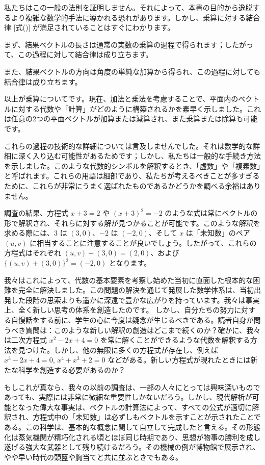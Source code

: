 \documentclass[a4paper,11pt,openany]{ltjsbook}
\begin{document}
私たちはこの一般の法則を証明しません。それによって、本書の目的から逸脱するより複雑な数学的手法に導かれる恐れがあります。しかし、乗算に対する結合律 [式(\gamma)] が満足されていることはすぐにわかります。

まず、結果ベクトルの長さは通常の実数の乗算の過程で得られます；したがって、この過程に対して結合律は成り立ちます。

また、結果ベクトルの方向は角度の単純な加算から得られ、この過程に対しても結合律は成り立ちます。

以上が乗算についてです。現在、加法と乗法を考慮することで、平面内のベクトルに対する代数や「計算」がどのように構築されるかを素早く示しました。これは任意の2つの平面ベクトルが加算または減算され、また乗算または除算も可能です。

これらの過程の技術的な詳細については言及しませんでした。それは数学的な詳細に深く入り込む可能性があるためです；しかし、私たちは一般的な手続き方法を示しました。このような代数的シンボルを解釈するとき、「虚数」や「複素数」と呼ばれます。これらの用語は細部であり、私たちが考えるべきことが多すぎるために、これらが非常にうまく選ばれたものであるかどうかを調べる余裕はありません。

調査の結果、方程式 $x + 3 = 2$ や $(x + 3)^{2} = -2$ のような式は常にベクトルの形で解釈され、それらに対する解が見つかることが可能です。このような解釈を求める際には、$3$ は $(3, 0)$、$-2$ は $(-2, 0)$、そして $x$ は「未知数」のペア $(u, v)$ に相当することに注意することが良いでしょう。したがって、これらの方程式はそれぞれ $(u, v) + (3, 0) = (2, 0)$、および $\{(u, v) + (3, 0)\}^{2} = (-2, 0)$ となります。

我々はこれによって、代数の基本要素を考察し始めた当初に直面した根本的な困難を完全に解決しました。この問題の解決を通じて発展した数学体系は、当初出発した段階の思索よりも遥かに深遠で豊かな広がりを持っています。我々は事実上、全く新しい思考の体系を創造したのです。
しかし、自分たちの努力に対する自慢話をする前に、学生の心に今度は疑念が生じるべきである。読者自身が問うべき質問は：このような新しい解釈の創造はどこまで続くのか？確かに、我々は二次方程式 $x^{2} - 2x + 4 = 0$ を常に解くことができるような代数を解釈する方法を見つけた。しかし、他の無限に多くの方程式が存在し、例えば $x^{3} - 2x + 4 = 0$, $x^{4} + x^{3} + 2 = 0$ などがある。新しい方程式が現れたときには新たな科学を創造する必要があるのか？

もしこれが真なら、我々の以前の調査は、一部の人々にとっては興味深いものであっても、実際には非常に微細な重要性しかないだろう。しかし、現代解析が可能となった偉大な事実は、ベクトルの計算法によって、すべての公式が適切に解釈され、方程式中の「未知数」は必ずしもベクトルを示すことが示されたことである。この科学は、基本的な概念に関して自立して完成したと言える。その形態化は蒸気機関が精巧化される頃とほぼ同じ時期であり、思想が物事の勝利を成し遂げる強大な武器として残り続けるだろう。その機械の例が博物館で展示され、やや早い時代の頭盔や胸当てと共に並ぶときでもある。
\end{document}
